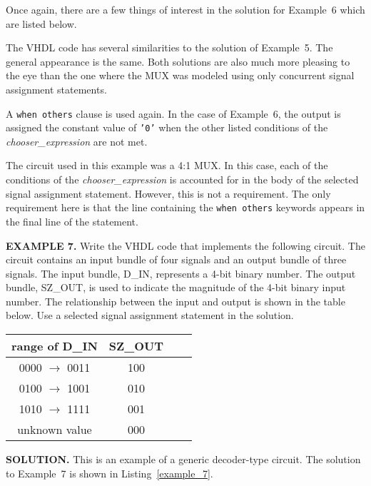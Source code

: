 Once again, there are a few things of interest in the solution for Example~6 which are listed below.
\begin{my_list}
\item The VHDL code has several similarities to the solution of Example~5. The general appearance is the same. Both solutions are also much more pleasing to the eye than the one where the MUX was modeled using only concurrent signal assignment statements.
\item A \texttt{when others} clause is used again. In the case of Example~6, the output is assigned the constant value of \texttt{'0'} when the other listed conditions of the \textit{chooser\_expression} are not met.
\item The circuit used in this example was a 4:1 MUX. In this case, each of the conditions of the \textit{chooser\_expression} is accounted for in the body of the selected signal assignment statement. However, this is not a requirement. The only requirement here is that the line containing the \texttt{when others} keywords appears in the final line of the statement.
\end{my_list}

\begin{leftbar}
\noindent
\textbf{EXAMPLE 7.} Write the VHDL code that implements the following circuit. The circuit contains an input bundle of four signals and an output bundle of three signals. The input bundle, D\_IN, represents a 4-bit binary number. The output bundle, SZ\_OUT, is used to indicate the magnitude of the 4-bit binary input number. The relationship between the input and output is shown in the table below. Use a selected signal assignment statement in the solution.

\centering\vspace{5pt}
\begin{tabular}{c*{2}{c}r}
range of D\_IN  & SZ\_OUT \\
\hline
0000 $\rightarrow$ 0011 & 100 \\
0100 $\rightarrow$ 1001 & 010 \\
1010 $\rightarrow$ 1111 & 001 \\
unknown value		& 000 \\
\end{tabular}
\end{leftbar}
\noindent
\textbf{SOLUTION.} This is an example of a generic decoder-type circuit. The solution to Example~7 is shown in Listing~\ref{example_7}.

\noindent
\begin{minipage}{0.99\linewidth}
\centering
{}
\end{minipage}

